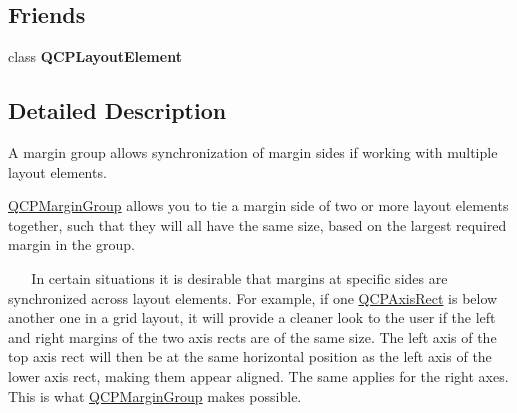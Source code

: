 \subsection*{Friends}
\begin{DoxyCompactItemize}
\item 
class {\bfseries Q\+C\+P\+Layout\+Element}\hypertarget{class_q_c_p_margin_group_a0790750c7e7f14fdbd960d172655b42b}{}\label{class_q_c_p_margin_group_a0790750c7e7f14fdbd960d172655b42b}

\end{DoxyCompactItemize}


\subsection{Detailed Description}
A margin group allows synchronization of margin sides if working with multiple layout elements. 

\hyperlink{class_q_c_p_margin_group}{Q\+C\+P\+Margin\+Group} allows you to tie a margin side of two or more layout elements together, such that they will all have the same size, based on the largest required margin in the group.

~\newline
~\newline
 In certain situations it is desirable that margins at specific sides are synchronized across layout elements. For example, if one \hyperlink{class_q_c_p_axis_rect}{Q\+C\+P\+Axis\+Rect} is below another one in a grid layout, it will provide a cleaner look to the user if the left and right margins of the two axis rects are of the same size. The left axis of the top axis rect will then be at the same horizontal position as the left axis of the lower axis rect, making them appear aligned. The same applies for the right axes. This is what \hyperlink{class_q_c_p_margin_group}{Q\+C\+P\+Margin\+Group} makes possible.

